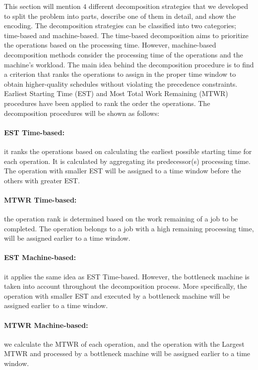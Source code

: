 \documentclass{tlp} %
\begin{document}
This section will mention $4$ different decomposition strategies that we developed to split the problem into parts, describe one of them in detail, and show the encoding. The decomposition strategies can be classified into two categories; time-based and machine-based. The time-based decomposition aims to prioritize the operations based on the processing time. However, machine-based decomposition methods consider the processing time of the operations and the machine's workload. The main idea behind the decomposition procedure is to find a criterion that ranks the operations to assign in the proper time window to obtain higher-quality schedules without violating the precedence constraints. Earliest Starting Time (EST) and Most Total Work Remaining (MTWR) procedures have been applied to rank the order the operations. The decomposition procedures will be shown as follows:

\paragraph{\textbf{EST Time-based}:} it ranks the operations based on calculating the earliest possible starting time for each operation. It is calculated by aggregating its predecessor(s) processing time. The operation with smaller EST will be assigned to a time window before the others with greater EST.

\paragraph{\textbf{MTWR Time-based}:} the operation rank is determined based on the work remaining of a job to be completed. The operation belongs to a job with a high remaining processing time, will be assigned earlier to a time window.

\paragraph{\textbf{EST Machine-based}:} it applies the same idea as EST Time-based. However, the bottleneck machine is taken into account throughout the decomposition process. More specifically, the operation with smaller EST and executed by a bottleneck machine will be assigned earlier to a time window.

\paragraph{\textbf{MTWR Machine-based}:} we calculate the MTWR of each operation, and the operation with the Largest MTWR and processed by a bottleneck machine will be assigned earlier to a time window.
\end{document}
